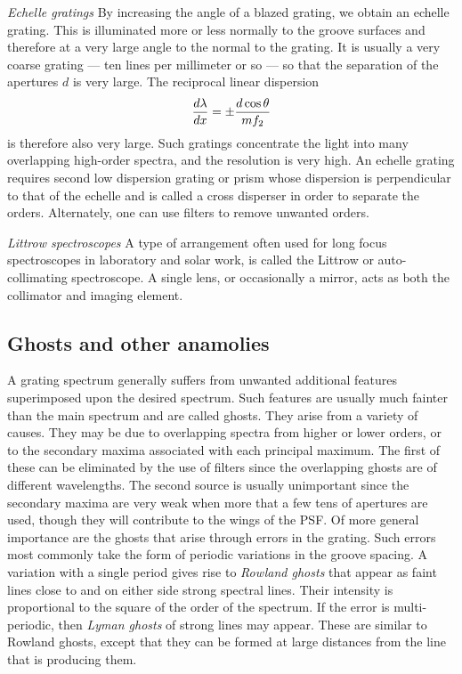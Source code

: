 \noindent
{\it Echelle gratings} By increasing the angle of a blazed grating, we obtain an echelle 
grating. This is illuminated more or less normally to the groove surfaces and therefore at
a very large angle to the normal to the grating. It is usually a very coarse grating ---
ten lines per millimeter or so --- so that the separation of the apertures $d$ is very large. The reciprocal linear dispersion
\[
{d\lambda\over dx}=\pm{d\cos\theta\over mf_2}
\]
is therefore also very large. Such gratings concentrate the light into many overlapping high-order spectra, and the resolution is very high. An echelle grating requires second
low dispersion grating or prism whose dispersion is perpendicular to that of the echelle
and is called a cross disperser in order to separate the orders. Alternately, one can use filters to remove unwanted orders.

\noindent
{\it Littrow spectroscopes} A type of arrangement often used for long focus spectroscopes in laboratory and solar work, is called the Littrow or auto-collimating spectroscope. A single lens, or occasionally a mirror, acts as both the collimator and imaging element.

\subsection{Ghosts and other anamolies}

A grating spectrum generally suffers from unwanted additional features superimposed upon the desired spectrum. Such features are usually much fainter than the main spectrum and are called ghosts. They arise from a variety of causes. They may be due
to overlapping spectra from higher or lower orders, or to the secondary maxima associated with each principal maximum. The first of these can be eliminated by the use
of filters since the overlapping ghosts are of different wavelengths. The second source
is usually unimportant since the secondary maxima are very weak when more that a few
tens of apertures are used, though they will contribute to the wings of the PSF. 
Of more general importance are the ghosts that arise through errors in the grating. 
Such errors most commonly take the form of periodic variations in the groove spacing.
A variation with a single period gives rise to {\it Rowland ghosts} that appear as faint
lines close to and on either side strong spectral lines. Their intensity is proportional to the square of the order of the spectrum. If the error is multi-periodic, then {\it Lyman ghosts} of strong lines may appear. These are similar to Rowland ghosts, except that they can be formed at large distances from the line that is producing them. 

